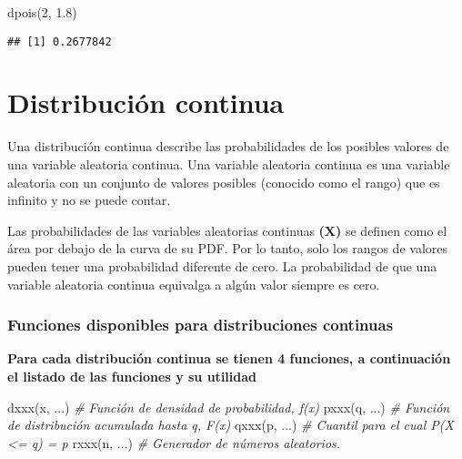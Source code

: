 \documentclass[
]{article}
\newenvironment{Shaded}{\begin{snugshade}}{\end{snugshade}}
\newcommand{\CommentTok}[1]{\textcolor[rgb]{0.56,0.35,0.01}{\textit{#1}}}
\newcommand{\DecValTok}[1]{\textcolor[rgb]{0.00,0.00,0.81}{#1}}
\newcommand{\FloatTok}[1]{\textcolor[rgb]{0.00,0.00,0.81}{#1}}
\newcommand{\FunctionTok}[1]{\textcolor[rgb]{0.00,0.00,0.00}{#1}}
\newcommand{\NormalTok}[1]{#1}
\begin{document}
\begin{Shaded}
\begin{Highlighting}[]
\FunctionTok{dpois}\NormalTok{(}\DecValTok{2}\NormalTok{, }\FloatTok{1.8}\NormalTok{)}
\end{Highlighting}
\end{Shaded}

\begin{verbatim}
## [1] 0.2677842
\end{verbatim}

\hypertarget{distribuciuxf3n-continua}{%
\section{Distribución continua}\label{distribuciuxf3n-continua}}

Una distribución continua describe las probabilidades de los posibles
valores de una variable aleatoria continua. Una variable aleatoria
continua es una variable aleatoria con un conjunto de valores posibles
(conocido como el rango) que es infinito y no se puede contar.

Las probabilidades de las variables aleatorias continuas \textbf{(X)} se
definen como el área por debajo de la curva de su PDF. Por lo tanto,
solo los rangos de valores pueden tener una probabilidad diferente de
cero. La probabilidad de que una variable aleatoria continua equivalga a
algún valor siempre es cero.

\hypertarget{funciones-disponibles-para-distribuciones-continuas}{%
\subsubsection{Funciones disponibles para distribuciones
continuas}\label{funciones-disponibles-para-distribuciones-continuas}}

\textbf{Para cada distribución continua se tienen 4 funciones, a
continuación el listado de las funciones y su utilidad}

\begin{Shaded}
\begin{Highlighting}[]
\FunctionTok{dxxx}\NormalTok{(x, ...)  }\CommentTok{\# Función de densidad de probabilidad, f(x)}
\FunctionTok{pxxx}\NormalTok{(q, ...)  }\CommentTok{\# Función de distribución acumulada hasta q, F(x)}
\FunctionTok{qxxx}\NormalTok{(p, ...)  }\CommentTok{\# Cuantil para el cual P(X \textless{}= q) = p}
\FunctionTok{rxxx}\NormalTok{(n, ...)  }\CommentTok{\# Generador de números aleatorios.}
\end{Highlighting}
\end{Shaded}
\end{document}
